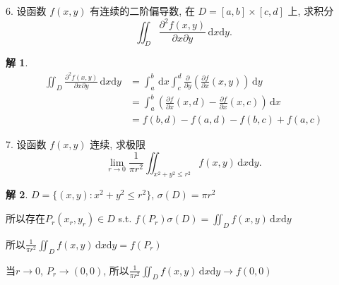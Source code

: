 \documentclass[a4paper,12pt]{article}
\theoremstyle{definition}
\newtheorem*{sol}{解}
\begin{document}
6. 设函数 $f(x,y)$ 有连续的二阶偏导数, 在 $D=[a,b]\times[c,d]$ 上, 求积分
$$\iint_{D} \frac{\partial^2 f(x,y)}{\partial x \partial y}\,\mathrm{d}x\mathrm{d}y.$$
\begin{sol}
    \begin{align*}
        \iint_{D} \frac{\partial^2 f(x,y)}{\partial x \partial y}\,\mathrm{d}x\mathrm{d}y
         & =\int_a^b\,\mathrm{d}x\int_c^d\frac{\partial}{\partial y}(\frac{\partial f}{\partial x}(x,y))\,\mathrm{d}y \\
         & =\int_a^b(\frac{\partial f}{\partial x}(x,d)-\frac{\partial f}{\partial x}(x,c))\,\mathrm{d}x              \\
         & =f(b,d)-f(a,d)-f(b,c)+f(a,c)
    \end{align*}
\end{sol}


7. 设函数 $f(x,y)$ 连续, 求极限
$$\lim_{r \to 0} \frac{1}{\pi r^2} \iint_{x^2+y^2 \leq r^2} f(x,y)\,\mathrm{d}x\mathrm{d}y.$$
\begin{sol}
    $D=\{(x,y): x^2+y^2 \leq r^2\}$, $\sigma(D)=\pi r^2$

    所以存在$P_r(x_r,y_r)\in D$ s.t. $f(P_r)\sigma(D)=\iint_D f(x,y)\,\mathrm{d}x\mathrm{d}y$

    所以$\frac{1}{\pi r^2} \iint_D f(x,y)\,\mathrm{d}x\mathrm{d}y=f(P_r)$

    当$r\to 0$, $P_r\to(0,0)$, 所以$\frac{1}{\pi r^2} \iint_D f(x,y)\,\mathrm{d}x\mathrm{d}y\to f(0,0)$
\end{sol}
\end{document}
